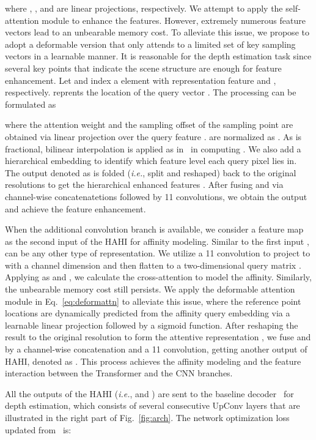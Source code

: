 \documentclass[twocolumn]{svjour3}    \pdfoutput=1
\begin{document}
where , , and  are linear projections, respectively. We attempt to apply the self-attention module to enhance the features. However, extremely numerous feature vectors lead to an unbearable memory cost. To alleviate this issue, we propose to adopt a deformable version that only attends to a limited set of key sampling vectors in a learnable manner. It is reasonable for the depth estimation task since several key points that indicate the scene structure are enough for feature enhancement. Let  and  index a element with representation feature  and , respectively.  reprents the location of the query vector . The processing can be formulated as

where the attention weight  and the sampling offset  of the  sampling point are obtained via linear projection over the query feature .  are normalized as . As  is fractional, bilinear interpolation is applied as in~\citep{dai2017deformable} in computing . We also add a hierarchical embedding to identify which feature level each query pixel lies in. The output denoted as  is folded (\textit{i.e.}, split and reshaped) back to the original resolutions to get the hierarchical enhanced features . After fusing  and  via channel-wise concatenatetions followed by 11 convolutions, we obtain the output  and achieve the feature enhancement.

When the additional convolution branch is available, we consider a feature map  as the second input of the HAHI for affinity modeling. Similar to the first input ,  can be any other type of representation. We utilize a 11 convolution to project  to  with a channel dimension  and then flatten  to a two-dimensional query matrix . Applying  as  and , we calculate the cross-attention to model the affinity. Similarly, the unbearable memory cost still persists. We apply the deformable attention module in Eq.~\ref{eq:deformattn} to alleviate this issue, where the reference point locations  are dynamically predicted from the affinity query embedding via a learnable linear projection followed by a sigmoid function. After reshaping the result to the original resolution to form the attentive representation , we fuse  and  by a channel-wise concatenation and a 11 convolution, getting another output of HAHI, denoted as . This process achieves the affinity modeling and the feature interaction between the Transformer and the CNN branches.

All the outputs of the HAHI (\textit{i.e.},  and ) are sent to the baseline decoder~\citep{alhashim2018densedepth, li2021simipu} for depth estimation, which consists of several consecutive UpConv layers that are illustrated in the right part of Fig.~\ref{fig:arch}. The network optimization loss updated from~\citep{eigen2014depth} is:
\end{document}
